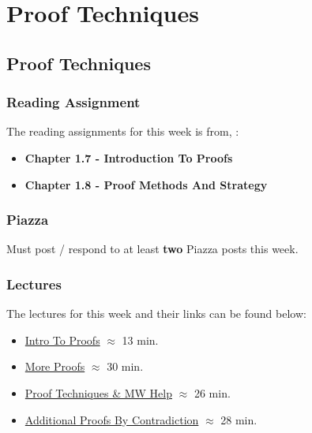 \clearpage

\renewcommand{\ChapTitle}{Proof Techniques}
\renewcommand{\SectionTitle}{Proof Techniques}

\chapter{\ChapTitle}
\section{\SectionTitle}

\subsection{Reading Assignment}

The reading assignments for this week is from, \Textbook:

\begin{itemize}
    \item \textbf{Chapter 1.7 - Introduction To Proofs}
    \item \textbf{Chapter 1.8 - Proof Methods And Strategy}
\end{itemize}

\subsection{Piazza}

Must post / respond to at least \textbf{two} Piazza posts this week.

\subsection{Lectures}

The lectures for this week and their links can be found below:

\begin{itemize}
    \item \href{https://drive.explaineverything.com/thecode/TREJHHM}{Intro To Proofs} $\approx$ 13 min.
    \item \href{https://drive.explaineverything.com/thecode/YNUCFDU}{More Proofs} $\approx$ 30 min.
    \item \href{https://drive.explaineverything.com/thecode/UAQXMXM}{Proof Techniques \& MW Help} $\approx$ 26 min.
    \item \href{https://applied.cs.colorado.edu/mod/hvp/view.php?id=51592}{Additional Proofs By Contradiction} $\approx$ 28 min.
\end{itemize}

